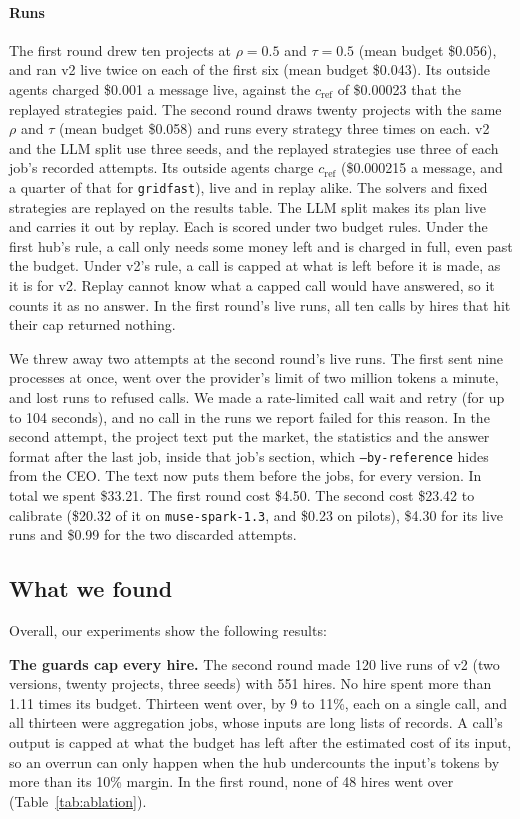 \paragraph{Runs} The first round drew ten projects at $\rho = 0.5$ and $\tau = 0.5$ (mean budget \$0.056), and ran
\sys{} v2 live twice on each of the first six (mean budget \$0.043). Its outside agents charged \$0.001 a message live,
against the $c_\mathrm{ref}$ of \$0.00023 that the replayed strategies paid. The second round draws twenty projects with
the same $\rho$ and $\tau$ (mean budget \$0.058) and runs every strategy three times on each. \sys{} v2 and the LLM split
use three seeds, and the replayed strategies use three of each job's recorded attempts. Its outside agents charge
$c_\mathrm{ref}$ (\$0.000215 a message, and a quarter of that for \texttt{gridfast}), live and in replay alike. The
solvers and fixed strategies are replayed on the results table. The LLM split makes its plan live and carries it out by
replay. Each is scored under two budget rules. Under the first hub's rule, a call only needs some money left and is
charged in full, even past the budget. Under v2's rule, a call is capped at what is left before it is made, as it is for
\sys{} v2. Replay cannot know what a capped call would have answered, so it counts it as no answer. In the first
round's live runs, all ten calls by hires that hit their cap returned nothing.

We threw away two attempts at the second round's live runs. The first sent nine processes at once, went over the
provider's limit of two million tokens a minute, and lost runs to refused calls. We made a rate-limited call wait and
retry (for up to 104 seconds), and no call in the runs we report failed for this reason. In the second attempt, the
project text put the market, the statistics and the answer format after the last job, inside that job's section, which
\texttt{--by-reference} hides from the CEO. The text now puts them before the jobs, for every version. In total we spent
\$33.21. The first round cost \$4.50. The second cost \$23.42 to calibrate (\$20.32 of it on \texttt{muse-spark-1.3},
and \$0.23 on pilots), \$4.30 for its live runs and \$0.99 for the two discarded attempts.

\subsection{What we found}
Overall, our experiments show the following results:

\textbf{The guards cap every hire.} The second round made 120 live runs of \sys{} v2 (two versions, twenty projects,
three seeds) with 551 hires. No hire spent more than 1.11 times its budget. Thirteen went over, by 9 to 11\%, each on a
single call, and all thirteen were aggregation jobs, whose inputs are long lists of records. A call's output is capped at
what the budget has left after the estimated cost of its input, so an overrun can only happen when the hub undercounts
the input's tokens by more than its 10\% margin. In the first round, none of 48 hires went over (Table~\ref{tab:ablation}).

